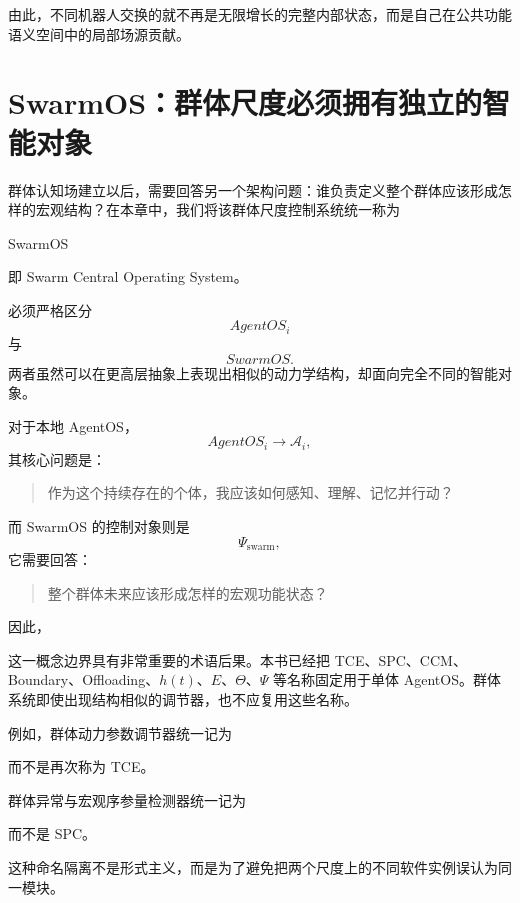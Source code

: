 由此，不同机器人交换的就不再是无限增长的完整内部状态，而是自己在公共功能语义空间中的局部场源贡献。


\section{SwarmOS：群体尺度必须拥有独立的智能对象}

群体认知场建立以后，需要回答另一个架构问题：谁负责定义整个群体应该形成怎样的宏观结构？在本章中，我们将该群体尺度控制系统统一称为
\begin{statementbox}
SwarmOS
\end{statementbox}
即 Swarm Central Operating System。

必须严格区分
\[
AgentOS_i
\]
与
\[
SwarmOS.
\]
两者虽然可以在更高层抽象上表现出相似的动力学结构，却面向完全不同的智能对象。

对于本地 AgentOS，
\[
AgentOS_i
\rightarrow
\mathcal A_i,
\]
其核心问题是：
\begin{quote}
作为这个持续存在的个体，我应该如何感知、理解、记忆并行动？
\end{quote}

而 SwarmOS 的控制对象则是
\[
\Psi_{\mathrm{swarm}},
\]
它需要回答：
\begin{quote}
整个群体未来应该形成怎样的宏观功能状态？
\end{quote}

因此，
\begin{statementbox}
\centering
{}
\end{statementbox}

这一概念边界具有非常重要的术语后果。本书已经把 TCE、SPC、CCM、Boundary、Offloading、$h(t)$、$E$、$\Theta$、$\Psi$ 等名称固定用于单体 AgentOS。群体系统即使出现结构相似的调节器，也不应复用这些名称。

例如，群体动力参数调节器统一记为
\begin{statementbox}
\centering
{}
\end{statementbox}
而不是再次称为 TCE。

群体异常与宏观序参量检测器统一记为
\begin{statementbox}
\centering
{}
\end{statementbox}
而不是 SPC。

这种命名隔离不是形式主义，而是为了避免把两个尺度上的不同软件实例误认为同一模块。



